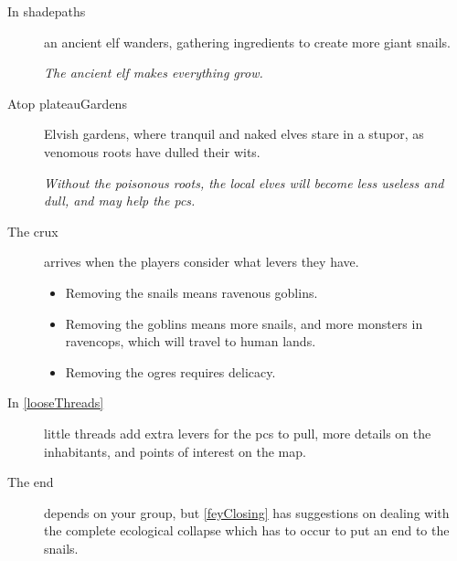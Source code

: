 \begin{multicols}{2}
\begin{description}
  \item[In \gls{shadepaths}]
  an ancient elf wanders, gathering \glspl{ingredient} to create more giant snails.

  \textit{The ancient elf makes everything grow.}

  \item[Atop \gls{plateauGardens}]
  Elvish gardens, where tranquil and naked elves stare in a stupor, as venomous roots have dulled their wits.

  \textit{Without the poisonous roots, the local elves will become less useless and dull, and may help the \glspl{pc}.}

  \item[The crux]
  arrives when the players consider what levers they have.
  \begin{itemize}
    \item
    Removing the snails means ravenous goblins.
    \item
    Removing the goblins means more snails, and more monsters in \gls{ravencops}, which will travel to human lands.
    \item
    Removing the \glspl{ogre} requires delicacy.
  \end{itemize}
  \item[In \autoref{looseThreads}]
  little \glspl{thread} add extra levers for the \glspl{pc} to pull, more details on the inhabitants, and points of interest on the map.

  \item[The end]
  depends on your group, but \autoref{feyClosing} has suggestions on dealing with the complete ecological collapse which has to occur to put an end to the snails.
\end{description}


\end{multicols}
